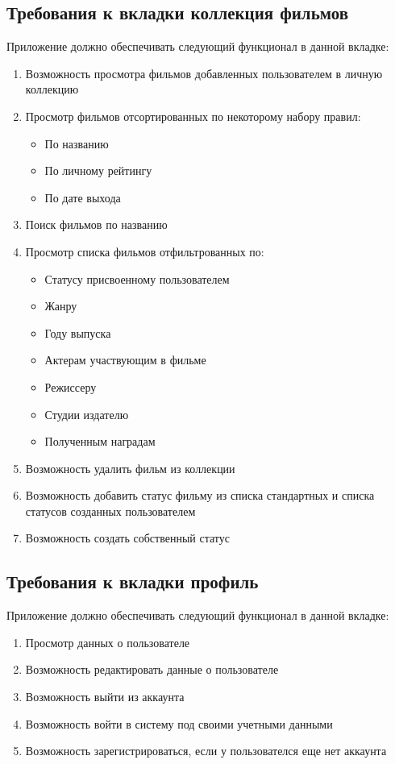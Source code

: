\documentclass[a4paper,16pt]{article}
\begin{document}
\subsection{Требования к вкладки коллекция фильмов}
Приложение должно обеспечивать следующий функционал в данной вкладке:
\begin{enumerate}
    \item Возможность просмотра фильмов добавленных пользователем в личную коллекцию
    \item Просмотр фильмов отсортированных по некоторому набору правил:
    \begin{itemize}
        \item По названию
        \item По личному рейтингу
        \item По дате выхода
    \end{itemize}
    \item Поиск фильмов по названию
    \item Просмотр списка фильмов отфильтрованных по:
    \begin{itemize}
        \item Статусу присвоенному пользователем
        \item Жанру
        \item Году выпуска
        \item Актерам участвующим в фильме
        \item Режиссеру
        \item Студии издателю
        \item Полученным наградам
    \end{itemize}
    \item Возможность удалить фильм из коллекции
    \item Возможность добавить статус фильму из списка стандартных и списка статусов созданных пользователем
    \item Возможность создать собственный статус
\end{enumerate}
\subsection{Требования к вкладки профиль}
Приложение должно обеспечивать следующий функционал в данной вкладке:
\begin{enumerate}
    \item Просмотр данных о пользователе
    \item Возможность редактировать данные о пользователе
    \item Возможность выйти из аккаунта
    \item Возможность войти в систему под своими учетными данными
    \item Возможность зарегистрироваться, если у пользователся еще нет аккаунта
\end{enumerate}
\end{document}
